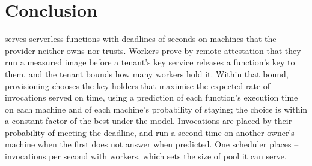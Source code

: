 \section{Conclusion}
\label{sec:conclusion}

\voss{} serves serverless functions with deadlines of seconds on machines that the provider neither owns nor trusts.
Workers prove by remote attestation that they run a measured image before a tenant's key service releases a
function's key to them, and the tenant bounds how many workers hold it. Within that bound, provisioning chooses the
key holders that maximise the expected rate of invocations served on time, using a prediction of each function's
execution time on each machine and of each machine's probability of staying; the choice is within a constant factor
of the best under the model. Invocations are placed by their probability of meeting the deadline, and run a second
time on another owner's machine when the first does not answer when predicted.
 One scheduler places \VDecCapLargeLo{}--\VDecCapLargeHi{} invocations per second
with \VDecPoolLarge{} workers, which sets the size of pool it can serve.
